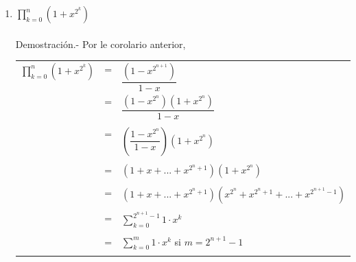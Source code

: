 \begin{enumerate}[ \bfseries 1.]
\begin{enumerate}[\bfseries (a)]
                \item $\displaystyle\prod_{k=0}^n (1+x^{2^k})$\\\\
                Demostración.- \; Por le corolario anterior,
                    \begin{center}
                        \begin{tabular}{r c l}
                            $\displaystyle\prod_{k=0}^n \left( 1+x^{2^k} \right)$&=&$\dfrac{(1 - x^{2^{n+1}})}{1-x}$\\
                            &=&$\dfrac{(1-x^{2^n})(1+x^{2^n})}{1-x}$\\\\
                            &=&$\left( \dfrac{1 - x^{2^n}}{1-x} \right) (1+x^{2^n})$\\\\
                            &=&$(1+x+...+x^{2^n + 1})(1 + x^{2^n})$\\\\
                            &=&$(1+x+...+x^{2^n + 1})(x^{2^n} + x^{2^n +1} + ... + x^{2^{n+1} - 1})$\\\\
                            &=&$\displaystyle\sum_{k=0}^{2^{n+1} - 1} 1 \cdot x^k$\\\\
                            &=&$\displaystyle\sum_{k=0}^{m} 1 \cdot x^k$ si $m = 2^{n+1} - 1$\\\\
                        \end{tabular}
                    \end{center}

            \end{enumerate}

    \end{enumerate}

